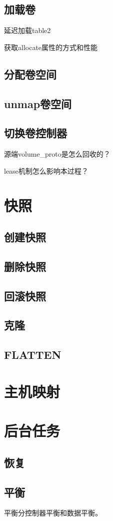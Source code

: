\subsection{加载卷}

\begin{compactenum}
\item 延迟加载table2
\item 获取allocate属性的方式和性能
\end{compactenum}

\subsection{分配卷空间}
\subsection{unmap卷空间}

\subsection{切换卷控制器}

\begin{compactenum}
\item 源端volume\_proto是怎么回收的？
\item lease机制怎么影响本过程？
\end{compactenum}

\section{快照}

\subsection{创建快照}
\subsection{删除快照}
\subsection{回滚快照}
\subsection{克隆}
\subsection{FLATTEN}

\section{主机映射}

\section{后台任务}

\subsection{恢复}

\subsection{平衡}

平衡分控制器平衡和数据平衡。
